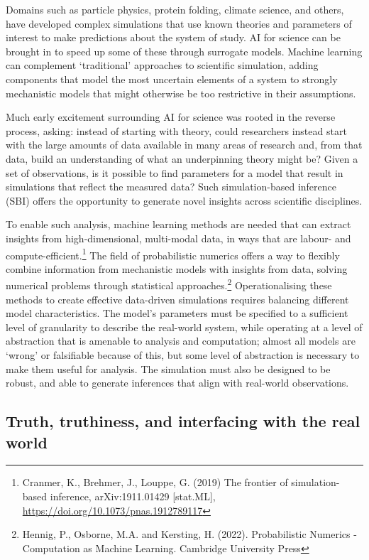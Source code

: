 Domains such as particle physics, protein folding, climate science, and
others, have developed complex simulations that use known theories and
parameters of interest to make predictions about the system of study. AI
for science can be brought in to speed up some of these through
surrogate models. Machine learning can complement `traditional'
approaches to scientific simulation, adding components that model the
most uncertain elements of a system to strongly mechanistic models that
might otherwise be too restrictive in their assumptions.

Much early excitement surrounding AI for science was rooted in the
reverse process, asking: instead of starting with theory, could
researchers instead start with the large amounts of data available in
many areas of research and, from that data, build an understanding of
what an underpinning theory might be? Given a set of observations, is it
possible to find parameters for a model that result in simulations that
reflect the measured data? Such simulation-based inference (SBI) offers
the opportunity to generate novel insights across scientific
disciplines.

To enable such analysis, machine learning methods are needed that can
extract insights from high-dimensional, multi-modal data, in ways that
are labour- and compute-efficient.\footnote{Cranmer, K., Brehmer, J.,
  Louppe, G. (2019) The frontier of simulation-based inference,
  arXiv:1911.01429 {[}stat.ML{]},
  \url{https://doi.org/10.1073/pnas.1912789117}} The field of
probabilistic numerics offers a way to flexibly combine information from
mechanistic models with insights from data, solving numerical problems
through statistical approaches.\footnote{Hennig, P., Osborne, M.A. and
  Kersting, H. (2022). Probabilistic Numerics - Computation as Machine
  Learning. Cambridge University Press} Operationalising these methods
to create effective data-driven simulations requires balancing different
model characteristics. The model's parameters must be specified to a
sufficient level of granularity to describe the real-world system, while
operating at a level of abstraction that is amenable to analysis and
computation; almost all models are `wrong' or falsifiable because of
this, but some level of abstraction is necessary to make them useful for
analysis. The simulation must also be designed to be robust, and able to
generate inferences that align with real-world observations.

\hypertarget{truth-truthiness-and-interfacing-with-the-real-world}{%
\subsection{Truth, truthiness, and interfacing with the real
world}\label{truth-truthiness-and-interfacing-with-the-real-world}}

